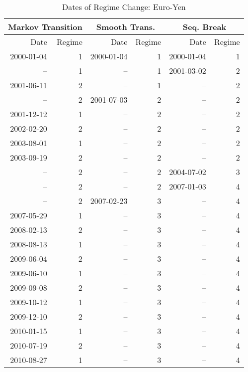 \begin{table}
	\centering
	\begin{threeparttable}
		\caption{Dates of Regime Change: Euro-Yen}	\label{tbl:regime_changes_euro_yen}
		\begin{tabular}[c]{r r | r r | r r}
			\midrule
			\multicolumn{2}{c}{Markov Transition} & \multicolumn{2}{c}{Smooth Trans.} & \multicolumn{2}{c}{Seq. Break} \\
			\midrule
			Date & Regime & Date & Regime & Date & Regime \\
			\midrule
			2000-01-04 &  1 & 2000-01-04 &  1 & 2000-01-04 &  1 \\
					-- &  1 &         -- &  1 & 2001-03-02 &  2 \\
			2001-06-11 &  2 &         -- &  1 &         -- &  2 \\
					-- &  2 & 2001-07-03 &  2 &         -- &  2 \\
			2001-12-12 &  1 &         -- &  2 &         -- &  2 \\
			2002-02-20 &  2 &         -- &  2 &         -- &  2 \\
			2003-08-01 &  1 &         -- &  2 &         -- &  2 \\
			2003-09-19 &  2 &         -- &  2 &         -- &  2 \\
					-- &  2 &         -- &  2 & 2004-07-02 &  3 \\
					-- &  2 &         -- &  2 & 2007-01-03 &  4 \\
					-- &  2 & 2007-02-23 &  3 &         -- &  4 \\
			2007-05-29 &  1 &         -- &  3 &         -- &  4 \\
			2008-02-13 &  2 &         -- &  3 &         -- &  4 \\
			2008-08-13 &  1 &         -- &  3 &         -- &  4 \\
			2009-06-04 &  2 &         -- &  3 &         -- &  4 \\
			2009-06-10 &  1 &         -- &  3 &         -- &  4 \\
			2009-09-08 &  2 &         -- &  3 &         -- &  4 \\
			2009-10-12 &  1 &         -- &  3 &         -- &  4 \\
			2009-12-10 &  2 &         -- &  3 &         -- &  4 \\
			2010-01-15 &  1 &         -- &  3 &         -- &  4 \\
			2010-07-19 &  2 &         -- &  3 &         -- &  4 \\
			2010-08-27 &  1 &         -- &  3 &         -- &  4 \\

\end{tabular}
\end{threeparttable}
\end{table}
